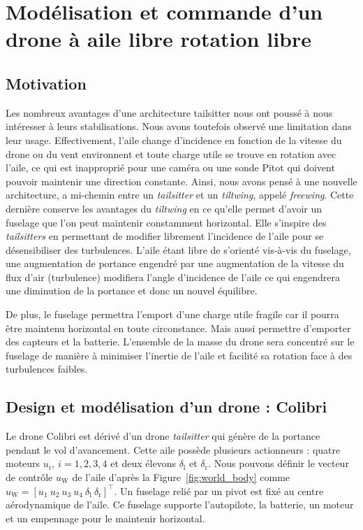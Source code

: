 
\chapter{Modélisation et commande d'un drone à aile libre rotation libre}
\minitoc
\label{chap:colibri}

\section{Motivation}
\label{sec:motivationcolibri}
Les nombreux avantages d'une architecture tailsitter nous ont poussé à nous intéresser à leurs stabilisations. Nous avons toutefois observé une limitation dans leur usage. Effectivement, l'aile change d'incidence en fonction de la vitesse du drone ou du vent environnent et toute charge utile se trouve en rotation avec l'aile, ce qui est inapproprié pour une caméra ou une sonde Pitot qui doivent pouvoir maintenir une direction constante. Ainsi, nous avons pensé à une nouvelle architecture, a mi-chemin entre un \textit{tailsitter} et un \textit{tiltwing}, appelé \textit{freewing}. Cette dernière conserve les avantages du \textit{tiltwing} en ce qu'elle permet d'avoir un fuselage que l'on peut maintenir constamment horizontal. Elle s'inspire des \textit{tailsitters} en permettant de modifier librement l'incidence de l'aile pour se désensibiliser des turbulences. L'aile étant libre de s'orienté vis-à-vis du fuselage, une augmentation de portance engendré par une augmentation de la vitesse du flux d'air (turbulence) modifiera l'angle d'incidence de l'aile ce qui engendrera une diminution de la portance et donc un nouvel équilibre.

De plus, le fuselage permettra l'emport d'une charge utile fragile car il pourra être maintenu horizontal en toute circonstance. Mais aussi permettre d'emporter des capteurs et la batterie. L'ensemble de la masse du drone sera concentré sur le fuselage de manière à minimiser l'inertie de l'aile et facilité sa rotation face à des turbulences faibles.

\section{Design et modélisation d'un drone : Colibri}
\label{sec:model_colibri}

Le drone Colibri est dérivé d'un drone \textit{tailsitter} qui génère de la portance pendant le vol d'avancement. Cette aile possède plusieurs actionneurs : quatre moteurs $u_{i}, ~i = 1,2,3,4$ et deux élevons $\delta_{\text{l}}$ et $\delta_{\text{r}}$. Nous pouvons définir le vecteur de contrôle $u_{\text{W}}$ de l'aile d'après la Figure~\ref{fig:world_body} comme $u_{\text{W}} = [u_{1}~u_{2}~u_{3}~u_{4}~\delta_{\text{l}}~\delta_{\text{r}}]^\top$. Un fuselage relié par un pivot est fixé au centre aérodynamique de l'aile. Ce fuselage supporte l'autopilote, la batterie, un moteur et un empennage pour le maintenir horizontal.

